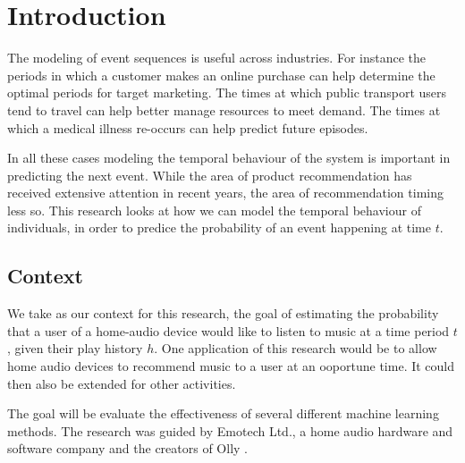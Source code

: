 
\chapter{Introduction} %

\label{Chapter1} %


\newcommand{\keyword}[1]{\textbf{#1}}
\newcommand{\tabhead}[1]{\textbf{#1}}
\newcommand{\code}[1]{\texttt{#1}}
\newcommand{\file}[1]{\texttt{\bfseries#1}}
\newcommand{\option}[1]{\texttt{\itshape#1}}

The modeling of event sequences is useful across industries. For instance the periods in which a customer makes an online purchase can help determine the optimal periods for target marketing. The times at which public transport users tend to travel can help better manage resources to meet demand. The times at which a medical illness re-occurs can help predict future episodes.
 
In all these cases modeling the temporal behaviour of the system is important in predicting the next event. While the area of product recommendation has received extensive attention in recent years, the area of recommendation timing less so. This research looks at how we can model the temporal behaviour of individuals, in order to predice the probability of an event happening at time $t$.

\section{Context}

We take as our context for this research, the goal of estimating the probability that a user of a home-audio device would like to listen to music at a time period $t$, given their play history $h$. One application of this research would be to allow home audio devices to recommend music to a user at an ooportune time. It could then also be extended for other activities.

The goal will be evaluate the effectiveness of several different machine learning methods. The research was guided by Emotech Ltd., a home audio hardware and software company and the creators of Olly \parencite{Olly}.

